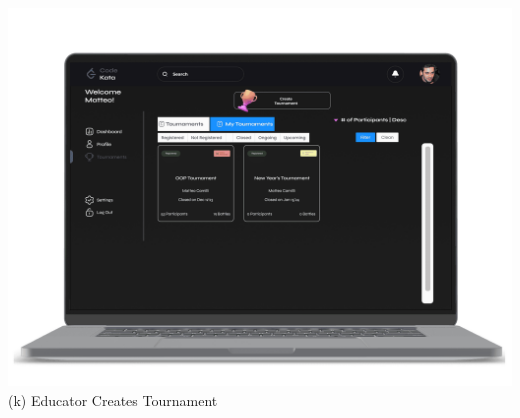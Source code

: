 \begin{center}
\includegraphics[scale=0.13]{Images/ui-ux/educator_create_tournament/educator_create_tournament_4.png}
        (k) Educator Creates Tournament
\end{center}
\newpage

